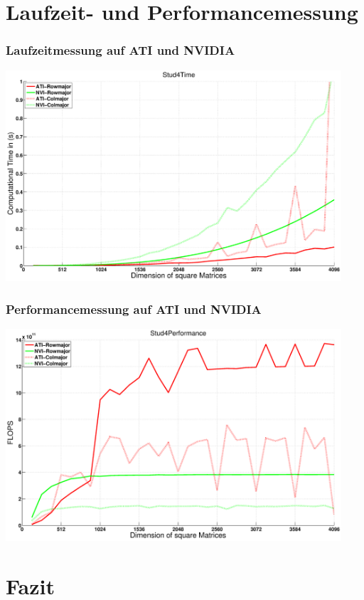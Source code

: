 \documentclass{beamer}
\begin{document}
\section{Laufzeit- und Performancemessung}
\begin{frame}
\frametitle{Laufzeitmessung auf ATI und NVIDIA}
\begin{center}
\includegraphics[width=12.5cm]{Stud4Time}
\end{center}

\end{frame}

\begin{frame}
\frametitle{Performancemessung auf ATI und NVIDIA}
\begin{center}
\includegraphics[width=12.5cm]{Stud4Performance}
\end{center}

\end{frame}


\section{Fazit}
\end{document}
